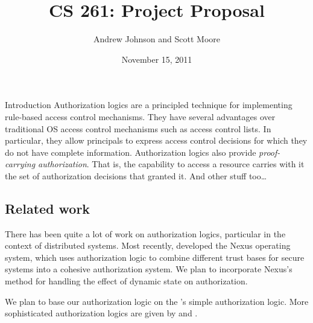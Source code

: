 \documentclass[10pt]{article}
\begin{document}
\title{CS 261: Project Proposal}
\author{Andrew Johnson and Scott Moore}
\date{November 15, 2011}

\maketitle

\thispagestyle{empty}

\begin{section}{Introduction}
Authorization logics are a principled technique for implementing rule-based access control mechanisms.
They have several advantages over traditional OS access control mechanisms such as access control lists.
In particular, they allow principals to express access control decisions for which they do not have complete information.
Authorization logics also provide \emph{proof-carrying authorization}. That is, the capability to access a resource carries with it the set of authorization decisions that granted it.
And other stuff too\ldots

\subsection{Related work}
There has been quite a lot of work on authorization logics, particular in the context of distributed systems.
Most recently, \citet{Nexus} developed the Nexus operating system, which uses authorization logic to combine different trust bases for secure systems into a cohesive authorization system.
We plan to incorporate Nexus's method for handling the effect of dynamic state on authorization.

We plan to base our authorization logic on the \citet{Bauer}'s simple authorization logic.
More sophisticated authorization logics are given by \citet{AURA} and \citet{Garg}.
\end{section}
\end{document}
